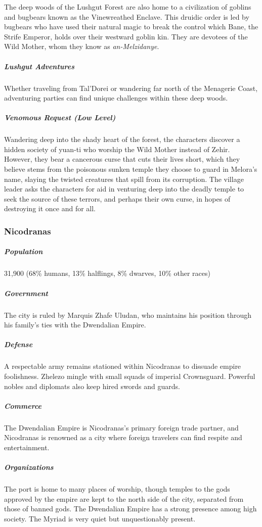 \documentclass[10pt,a4paper,twoside,bg=print,twocolumn,openany,nodeprecatedcode]{dndbook}
\begin{document}
The deep woods of the Lushgut Forest are also home to a civilization of goblins and bugbears known as the Vinewreathed Enclave. This druidic order is led by bugbears who have used their natural magic to break the control which Bane, the Strife Emperor, holds over their westward goblin kin. They are devotees of the Wild Mother, whom they know as \textit{an-Melzidanye}.

\subparagraph{Lushgut Adventures}
Whether traveling from Tal'Dorei or wandering far north of the Menagerie Coast, adventuring parties can find unique challenges within these deep woods.

\subparagraph{Venomous Request (Low Level)}
Wandering deep into the shady heart of the forest, the characters discover a hidden society of yuan-ti who worship the Wild Mother instead of Zehir. However, they bear a cancerous curse that cuts their lives short, which they believe stems from the poisonous sunken temple they choose to guard in Melora's name, slaying the twisted creatures that spill from its corruption. The village leader asks the characters for aid in venturing deep into the deadly temple to seek the source of these terrors, and perhaps their own curse, in hopes of destroying it once and for all.

\subsubsection{Nicodranas}
\subparagraph{Population}
31,900 (68\% humans, 13\% halflings, 8\% dwarves, 10\% other races)

\subparagraph{Government}
The city is ruled by Marquis Zhafe Uludan, who maintains his position through his family's ties with the Dwendalian Empire.

\subparagraph{Defense}
A respectable army remains stationed within Nicodranas to dissuade empire foolishness. Zhelezo mingle with small squads of imperial Crownsguard. Powerful nobles and diplomats also keep hired swords and guards.

\subparagraph{Commerce}
The Dwendalian Empire is Nicodranas's primary foreign trade partner, and Nicodranas is renowned as a city where foreign travelers can find respite and entertainment.

\subparagraph{Organizations}
The port is home to many places of worship, though temples to the gods approved by the empire are kept to the north side of the city, separated from those of banned gods. The Dwendalian Empire has a strong presence among high society. The Myriad is very quiet but unquestionably present.
\end{document}
